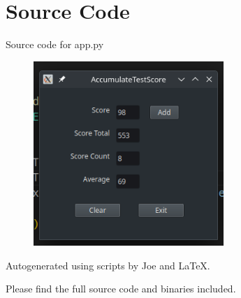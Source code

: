 \documentclass[12pt]{article}
\begin{document}
\maketitle
\pagebreak


\section{Source Code}

Source code for \textsf{app.py}


% 

\newpage

\begin{figure}[H]
  \centering
  \includegraphics[height=7cm]{ex1.png}
\end{figure}

\newpage

Autogenerated using scripts by Joe and \LaTeX.

Please find the full source code and binaries included.
\end{document}
